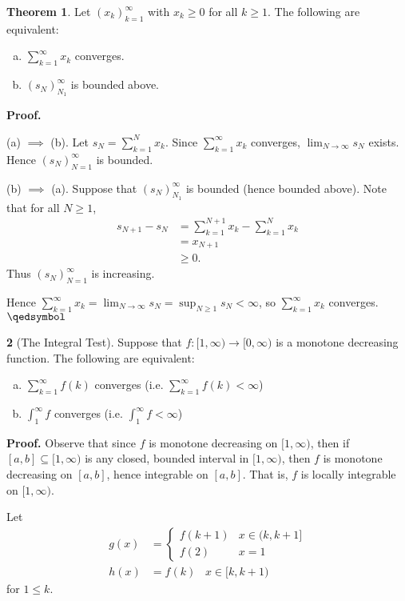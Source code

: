 \documentclass[11pt]{article}
\theoremstyle{definition}
\newtheorem{thm}{Theorem}[section]
\newtheorem{none}[thm]{}
\begin{document}
\begin{thm}
Let $(x_k)_{k=1}^\infty$ with $x_k \geq 0$ for all $k \geq 1$. The following are equivalent:
\begin{enumerate}[(a)] \vspace{-0.2cm}
\item $\sum_{k=1}^\infty x_k$ converges.
\item $(s_N)_{N_1}^\infty$ is bounded above.
\end{enumerate}
\end{thm}
\textbf{Proof.}

(a) $\implies$ (b). Let $s_N = \sum_{k=1}^N x_k$. Since $\sum_{k=1}^\infty x_k$ converges, $\lim_{N\to\infty} s_N$ exists. Hence $(s_N)_{N=1}^\infty$ is bounded. 

(b) $\implies$ (a). Suppose that $(s_N)_{N_1}^\infty$ is bounded (hence bounded above). Note that for all $N \geq 1$,
\begin{align*}
s_{N+1} - s_N & = \sum_{k=1}^{N+1} x_k - \sum_{k=1}^N x_k \\ & = x_{N+1} \\ & \geq 0 \text{.}
\end{align*}
Thus $(s_N)_{N=1}^\infty$ is increasing. 

Hence $\sum_{k=1}^\infty x_k = \lim_{N\to\infty} s_N = \sup_{N\geq 1} s_N < \infty$, so $\sum_{k=1}^\infty x_k$ converges. $\qedsymbol$


\begin{none}[The Integral Test]
Suppose that $f: [1, \infty) \to [0, \infty)$ is a monotone decreasing function. The following are equivalent:
\begin{enumerate}[(a)] \vspace{-0.2cm}
\item $\sum_{k=1}^\infty f(k)$ converges (i.e. $\sum_{k=1}^\infty f(k) < \infty$)
\item $\int_1^\infty f$ converges (i.e. $\int_1^\infty f < \infty$)
\end{enumerate}
\end{none}
\textbf{\small Proof.} Observe that since $f$ is monotone decreasing on $[1, \infty)$, then if $[a, b] \subseteq [1, \infty)$ is any closed, bounded interval in $[1, \infty)$, then $f$ is monotone decreasing on $[a, b]$, hence integrable on $[a, b]$. That is, $f$ is locally integrable on $[1, \infty)$. 

Let 
\begin{align*} 
g(x) & = \begin{cases} f(k+1) & x \in (k, k+1] \\ f(2) & x = 1 \end{cases} \\
h(x) & = f(k) \hspace{10pt} x \in [k, k+1) 
\end{align*}
for $1 \leq k$. 
\end{document}
